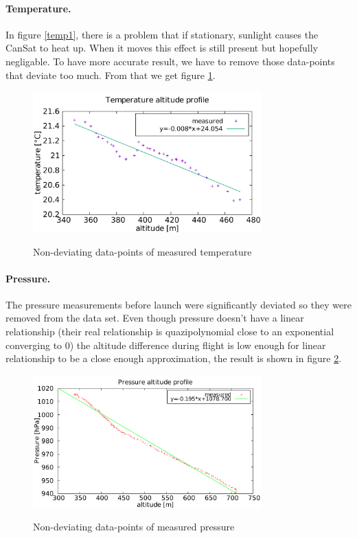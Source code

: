 \documentclass{cfp}
\begin{document}
\paragraph{Temperature.} In figure \ref{temp1}, there is a problem that if stationary, sunlight causes the CanSat to heat up. When it moves this effect is still present but hopefully negligable. To have more accurate result, we have to remove those data-points that deviate too much. From that we get figure \ref{temp2}.
\begin{figure}[!h]
\centering
\caption{Non-deviating data-points of measured temperature}
\includegraphics[width=250pt]{temp.pdf}
\label{temp2}
\end{figure}
\paragraph{Pressure.} The pressure measurements before launch were significantly deviated so they were removed from the data set. Even though pressure doesn't have a linear relationship (their real relationship is quazipolynomial close to an exponential converging to 0) the altitude difference during flight is low enough for linear relationship to be a close enough approximation, the result is shown in figure \ref{press}.
\begin{figure}[!h]
\centering
\caption{Non-deviating data-points of measured pressure}
\includegraphics[width=250pt]{press.pdf}
\label{press}
\end{figure}
\end{document}
